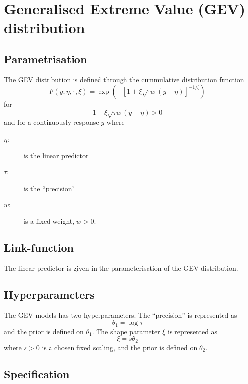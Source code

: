 \documentclass[a4paper,11pt]{article}
\begin{document}
\section*{Generalised Extreme Value (GEV) distribution}

\subsection*{Parametrisation}

The GEV distribution is defined through the cummulative distribution
function
\begin{displaymath}
    F(y; \eta, \tau, \xi) =
    \exp\left(
      - \left[ 1 + \xi \sqrt{\tau w} (y-\eta)\right]^{-1/\xi}
    \right)
\end{displaymath}
for
\begin{displaymath}
    1 + \xi \sqrt{\tau w} (y-\eta) > 0
\end{displaymath}
and for a continuously response $y$ where
\begin{description}
\item[$\eta$:] is the linear predictor
\item[$\tau$:] is the ``precision''
\item[$w$:] is a fixed weight, $w>0$.    
\end{description}

\subsection*{Link-function}

The linear predictor is given in the parameterisation of the GEV
distribution.

\subsection*{Hyperparameters}

The GEV-models has two hyperparameters.
The ``precision'' is represented as
\begin{displaymath}
    \theta_{1} = \log \tau
\end{displaymath}
and the prior is defined on $\theta_{1}$.  The shape parameter $\xi$
is represented as
\begin{displaymath}
    \xi = s\theta_{2}
\end{displaymath}
where $s > 0$ is a chosen fixed scaling, and the prior is defined on
$\theta_{2}$.

\subsection*{Specification}
\end{document}
